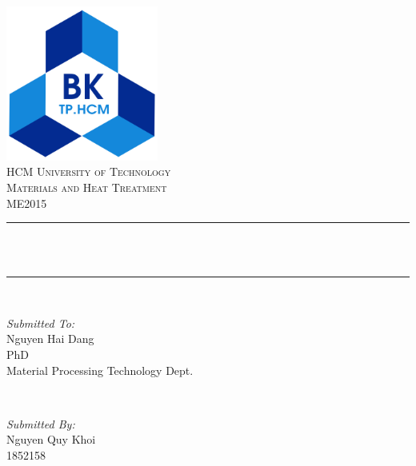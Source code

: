 \documentclass{presets}
\begin{document}
	\begin{titlepage}
		\centering
		\includegraphics[width=5cm]{logo.png}\\[1.0 cm]	%
		\textsc{\LARGE HCM University of Technology}\\[1cm] %
		\textsc{\Large Materials and Heat Treatment}\\[0.5cm] %
		\textsc{\Large ME2015}\\[0.5 cm]				%
		\rule{\linewidth}{0.2 mm} \\[0.4 cm]
		{ \huge \bfseries \thetitle}\\
		\rule{\linewidth}{0.2 mm}\\[1.5cm]
		
		\begin{minipage}[t]{0.4\textwidth}
			\begin{flushleft} \large
				\emph{Submitted To:}\\
				Nguyen Hai Dang\\
				PhD\\
				Material Processing Technology Dept.\\
			\end{flushleft}
		\end{minipage}~
		\begin{minipage}[t]{0.4\textwidth}
			
			\begin{flushright} \large
				\emph{Submitted By:} \\
				Nguyen Quy Khoi\\
				1852158
			\end{flushright}
			
		\end{minipage}\\[2 cm]
		
	\end{titlepage}
	\tableofcontents
	\listoftables
	\listoffigures
	
	
	
%	
%	
\end{document}
